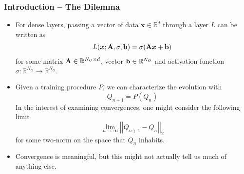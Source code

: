 \documentclass[11pt,aspectratio=169]{beamer}
\newcommand{\norm}[1]{\left|\left|#1\right|\right|}
\newcommand{\R}{\mathbb{R}}
\begin{document}
    \begin{frame}
        \frametitle{Introduction -- The Dilemma}
        \begin{itemize}
            \item 
            For dense layers, passing a vector of 
            data $\boldsymbol{x} \in \R^{d}$ through a layer $L$ can be written as 
            \begin{equation}
                L(\boldsymbol{x}; {\bf A}, \sigma, {\bf b}) = \sigma({\bf A}\boldsymbol{x} + {\bf b})
            \end{equation}
            for some matrix ${\bf A} \in \R^{N_O\times d}$, vector ${\bf b} \in \R^{N_O}$ and
            activation function $\sigma: \R^{N_O} \to \R^{N_O}$. 
            \item
            Given a training procedure $P$, we can characterize the evolution with
            \begin{equation}
                Q_{n+1} = P(Q_n)
            \end{equation}
            In the interest of examining 
            convergences, one might consider the following limit 
            \begin{equation}
                \lim_{n\to\infty} \norm{Q_{n+1} - Q_n}_2    
            \end{equation}
            for some two-norm on the space that $Q_n$ inhabits. 
            \item
            Convergence is meaningful, but this might not actually tell us much of anything else.
        \end{itemize}
    \end{frame}

\end{document}

